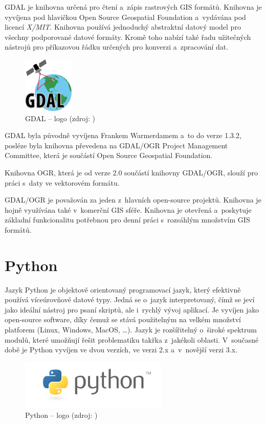 \documentclass[a4paper,12pt,oneside]{book}
\begin{document}
GDAL je knihovna určená pro čtení a~zápis rastrových GIS formátů. Knihovna je vyvíjena pod hlavičkou Open Source Geospatial Foundation a~vydávána pod licencí \textit{X/MIT}. Knihovna používá jednoduchý abstraktní datový model pro všechny podporované datové formáty. Kromě toho nabízí také řadu užitečných nástrojů pro příkazovou řádku určených pro konverzi a~zpracování dat. \cite{gdal_wiki}

\begin{figure}[h]
\centering
\includegraphics[scale=1]{images/gdal-logo.png}
\caption[GDAL -- logo]{GDAL -- logo (zdroj: \cite{gdal})}
\end{figure}

GDAL byla původně vyvíjena Frankem Warmerdamem a~to do verze 1.3.2, posléze byla knihovna převedena na GDAL/OGR Project Management Committee, která je součástí Open Source Geospatial Foundation.\cite{gdal_wiki}

Knihovna OGR, která je od verze 2.0 součástí knihovny GDAL/OGR, slouží pro práci s~daty ve vektorovém formátu.\cite{gdal}

GDAL/OGR je považován za jeden z~hlavních open-source projektů. Knihovna je hojně využívána také v~komerční GIS sféře. Knihovna je otevřená a~poskytuje základní funkcionalitu potřebnou pro denní práci s~rozsáhlým množstvím GIS formátů.\cite{gdal_wiki}


\section{Python}

Jazyk Python je objektově orientovaný programovací jazyk, který efektivně používá víceúrovňové datové typy. Jedná se o~jazyk interpretovaný, čímž se jeví jako ideální nástroj pro psaní skriptů, ale i~rychlý vývoj aplikací. Je vyvíjen jako open-source software, díky čemuž se stává použitelným na velkém množství platforem (Linux, Windows, MacOS, \dots). Jazyk je rozšířitelný o~široké spektrum modulů, které umožňují řešit problematiku takřka z~jakékoli oblasti. V~současné době je Python vyvíjen ve dvou verzích, ve verzi 2.x a~v~novější verzi 3.x.
\cite{dive_into_python}
\cite{python_web}

\begin{figure}[htb]
\centering
\includegraphics[scale=1]{images/python-logo.png}
\caption[Python -- logo]{Python -- logo (zdroj: \cite{python_web})}
\end{figure}
\end{document}
